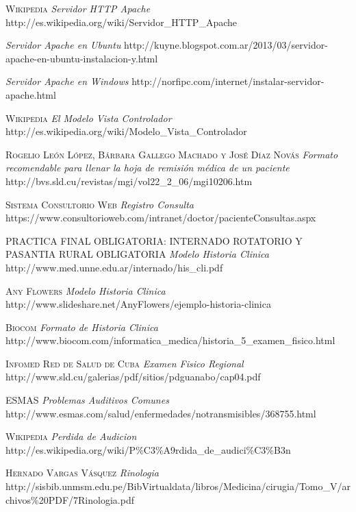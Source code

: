 \begin{thebibliography}{X}

     \textsc{Wikipedia} \textit{Servidor HTTP Apache} 
        http://es.wikipedia.org/wiki/Servidor\_HTTP\_Apache 

     \textit{Servidor Apache en Ubuntu} 
        http://kuyne.blogspot.com.ar/2013/03/servidor-apache-en-ubuntu-instalacion-y.html     

     \textit{Servidor Apache en Windows} 
        http://norfipc.com/internet/instalar-servidor-apache.html

     \textsc{Wikipedia} \textit{El Modelo Vista Controlador}
        http://es.wikipedia.org/wiki/Modelo\_Vista\_Controlador

     \textsc{Rogelio León López, Bárbara Gallego Machado y José Díaz Novás} \textit{Formato recomendable para llenar la hoja de remisión médica de un paciente} 
        http://bvs.sld.cu/revistas/mgi/vol22\_2\_06/mgi10206.htm 

     \textsc{Sistema Consultorio Web} \textit{Registro Consulta}
        https://www.consultorioweb.com/intranet/doctor/pacienteConsultas.aspx
    
     \textsc{PRACTICA FINAL OBLIGATORIA: INTERNADO ROTATORIO Y PASANTIA RURAL OBLIGATORIA} \textit{Modelo Historia Clinica} 
        http://www.med.unne.edu.ar/internado/his\_cli.pdf
    
     \textsc{Any Flowers} \textit{Modelo Historia Clinica}
        http://www.slideshare.net/AnyFlowers/ejemplo-historia-clinica
    
     \textsc{Biocom} \textit{Formato de Historia Clinica}
        http://www.biocom.com/informatica\_medica/historia\_5\_examen\_fisico.html
    
     \textsc{Infomed Red de Salud de Cuba} \textit{Examen Fisico Regional} 
        http://www.sld.cu/galerias/pdf/sitios/pdguanabo/cap04.pdf
    
     \textsc{ESMAS} \textit{Problemas Auditivos Comunes}
        http://www.esmas.com/salud/enfermedades/notransmisibles/368755.html
    
     \textsc{Wikipedia} \textit{Perdida de Audicion}
        http://es.wikipedia.org/wiki/P\%C3\%A9rdida\_de\_audici\%C3\%B3n

     \textsc{Hernado Vargas Vásquez} \textit{Rinologia}
        http://sisbib.unmsm.edu.pe/BibVirtualdata/libros/Medicina/cirugia/Tomo\_V/archivos\%20PDF/7Rinologia.pdf
    

\end{thebibliography}
